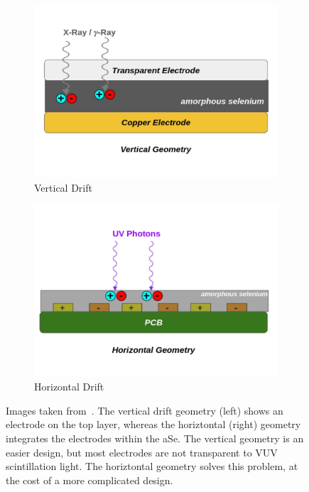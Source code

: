 \begin{figure}
\centering
\begin{subfigure}{.45\textwidth}
  \centering
  \includegraphics[width=\textwidth]{images/qpix_light_vertical_geom.pdf}
  \caption{Vertical Drift}
\end{subfigure}%
\begin{subfigure}{.45\textwidth}
  \centering
  \includegraphics[width=\textwidth]{images/qpix_light_horizontal_geom.pdf}
  \caption{Horizontal Drift}
\end{subfigure}
\caption{Images taken from~\citep{https://doi.org/10.48550/arxiv.2207.11127}.
The vertical drift geometry (left) shows an electrode on the top layer, whereas the horiztontal (right) geometry integrates the electrodes within the aSe.
The vertical geometry is an easier design, but most electrodes are not transparent to VUV scintillation light.
The horiztontal geometry solves this problem, at the cost of a more complicated design.
}
\label{fig:qpix_light_geometries}
\end{figure}

